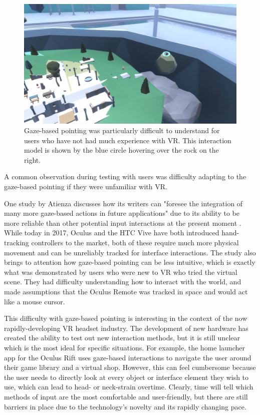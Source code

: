 \documentclass[10pt,twocolumn,letterpaper]{article}
\begin{document}
\begin{figure}[t]
\begin{center}
\includegraphics[width=1.0\linewidth]{images/gazepointing.jpg}
\end{center}
   \caption{ Gaze-based pointing was particularly difficult to understand for users who have not had much experience with VR. This interaction model is shown by the blue circle hovering over the rock on the right. }
\label{fig:long}
\label{fig:onecol}
\end{figure}

A common observation during testing with users was difficulty adapting to the gaze-based pointing if they were unfamiliar with VR.

One study by Atienza \etal discusses how its writers can "foresee the integration of many more gaze-based actions in future applications" due to its ability to be more reliable than other potential input interactions at the present moment \cite{7519387}. While today in 2017, Oculus and the HTC Vive have both introduced hand-tracking controllers to the market, both of these require much more physical movement and can be unreliably tracked for interface interactions. The study also brings to attention how  gaze-based pointing can be less intuitive, which is exactly what was demonstrated by users who were new to VR who tried the virtual scene. They had difficulty understanding how to interact with the world, and made assumptions that the Oculus Remote was tracked in space and would act like a mouse cursor.

This difficulty with gaze-based pointing is interesting in the context of the now rapidly-developing VR headset industry. The development of new hardware has created the ability to test out new interaction methods, but it is still unclear which is the most ideal for specific situations. For example, the home launcher app for the Oculus Rift uses gaze-based interactions to navigate the user around their game library and a virtual shop. However, this can feel cumbersome because the user needs to directly look at every object or interface element they wish to use, which can lead to head- or neck-strain overtime. Clearly, time will tell which methods of input are the most comfortable and user-friendly, but there are still barriers in place due to the technology's novelty and its rapidly changing pace.
\end{document}
